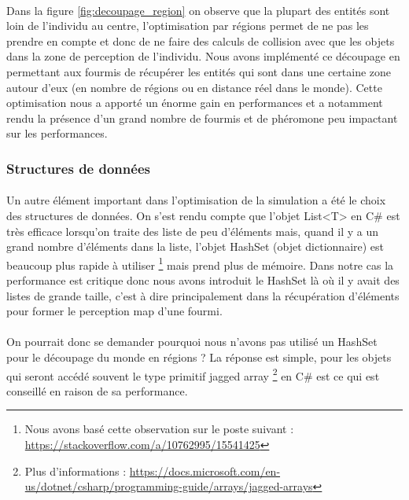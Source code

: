 \documentclass{EPUProjetDi}
\begin{document}
\paragraph{}
Dans la figure \ref{fig:decoupage_region} on observe que la plupart des entités sont loin de l'individu au centre, l'optimisation par régions permet de ne pas les prendre en compte et donc de ne faire des calculs
de collision avec que les objets dans la zone de perception de l'individu.
Nous avons implémenté ce découpage en permettant aux fourmis de récupérer les entités qui sont dans une certaine zone autour d'eux (en nombre de régions ou en distance réel dans le monde).
Cette optimisation nous a apporté un énorme gain en performances et a notamment rendu la présence d'un grand nombre de fourmis et de phéromone peu impactant sur les performances.

\subsubsection{Structures de données}
\paragraph{}
Un autre élément important dans l'optimisation de la simulation a été le choix des structures de données. 
On s'est rendu compte que l'objet List<T> en C\# est très efficace lorsqu'on traite des liste de peu d'éléments
mais, quand il y a un grand nombre d'éléments dans la liste, l'objet HashSet (objet dictionnaire) est beaucoup plus rapide à utiliser
\footnote{Nous avons basé cette observation sur le poste suivant : \url{https://stackoverflow.com/a/10762995/15541425}} mais prend plus de mémoire.
Dans notre cas la performance est critique donc nous avons introduit le HashSet là où il y avait des listes de grande taille, 
c'est à dire principalement dans la récupération d'éléments pour former le perception map d'une fourmi.

\paragraph{}
On pourrait donc se demander pourquoi nous n'avons pas utilisé un HashSet pour le découpage du monde en régions ? 
La réponse est simple, pour les objets qui seront accédé souvent le type primitif jagged array
\footnote{Plus d'informations : \url{https://docs.microsoft.com/en-us/dotnet/csharp/programming-guide/arrays/jagged-arrays}}
en C\# est ce qui est conseillé en raison de sa performance.
\end{document}

